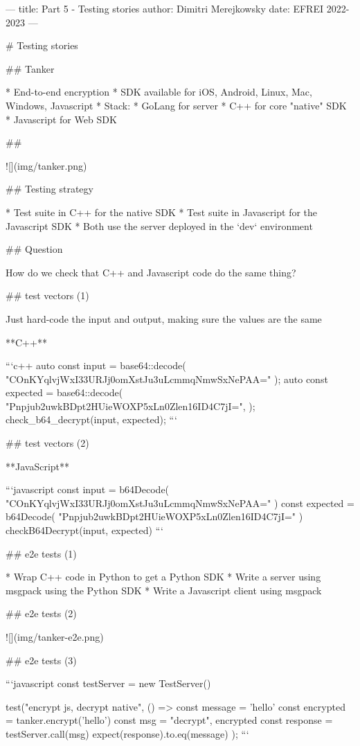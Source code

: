 ---
title: Part 5 - Testing stories
author: Dimitri Merejkowsky
date: EFREI 2022-2023
---


# Testing stories

## Tanker

* End-to-end encryption
* SDK available for iOS, Android, Linux, Mac, Windows, Javascript
* Stack:
   * GoLang for server
   * C++ for core "native" SDK
   * Javascript for Web SDK

##

![](img/tanker.png)

## Testing strategy

* Test suite in C++ for the native SDK
* Test suite in Javascript for the Javascript SDK
* Both use the server deployed in the `dev` environment

## Question

How do we check that C++ and Javascript code do the same thing?

## test vectors (1)

Just hard-code the input and output, making sure
the values are the same

**C++**

```c++
auto const input    = base64::decode(
    "COnKYqlvjWxI33URJj0omXstJu3uLcmmqNmwSxNePAA="
);
auto const expected = base64::decode(
    "Pnpjub2uwkBDpt2HUieWOXP5xLn0Zlen16ID4C7jI=",
);
check_b64_decrypt(input, expected);
```

## test vectors (2)

**JavaScript**


```javascript
const input    = b64Decode(
    "COnKYqlvjWxI33URJj0omXstJu3uLcmmqNmwSxNePAA="
)
const expected = b64Decode(
    "Pnpjub2uwkBDpt2HUieWOXP5xLn0Zlen16ID4C7jI="
)
checkB64Decrypt(input, expected)
```

## e2e tests (1)

* Wrap C++ code in Python to get a Python SDK
* Write a server using msgpack using the Python SDK
* Write a Javascript client using msgpack

## e2e tests (2)

![](img/tanker-e2e.png)

## e2e tests (3)

```javascript
const testServer = new TestServer()

test("encrypt js, decrypt native", () => {
    const message = 'hello'
    const encrypted = tanker.encrypt('hello')
    const msg = {"decrypt", encrypted }
    const response =  testServer.call(msg)
    expect(response).to.eq(message)
});
```



